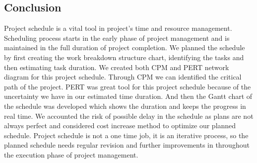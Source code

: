 \begin{spacing}{1}
\section{Conclusion}  
Project schedule is a vital tool in project's time and resource management. Scheduling process starts in the early phase of project management and is maintained in the full duration of project completion. We planned the schedule by first creating the work breakdown structure chart, identifying the tasks and then estimating task duration. We created both CPM and PERT network diagram for this project schedule. Through CPM we can identified the critical path of the project. PERT was great tool for this project schedule because of the uncertainty we have in our estimated time duration. And then the Gantt chart of the schedule was developed which shows the duration and keeps the progress in real time. We accounted the risk of possible delay in the schedule as plans are not always perfect and considered cost increase method to optimize our planned schedule. Project schedule is not a one time job, it is an iterative process, so the planned schedule needs regular revision and further improvements in throughout the execution phase of project management.
  
\end{spacing}
